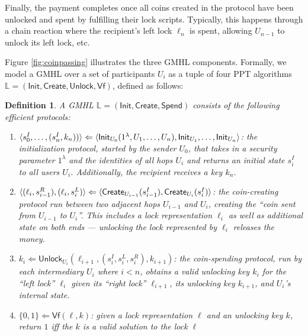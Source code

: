 \documentclass[USenglish,oneside,twocolumn]{article}
\newtheorem{definition}{Definition}[section]
\begin{document}
Finally, the payment completes once all coins created in the protocol have been unlocked and spent by fulfilling their lock scripts. Typically, this happens through a chain reaction where the recipient's left lock $\ell_n$ is spent, allowing $U_{n-1}$ to unlock its left lock, etc.

Figure \ref{fig:coinpassing} illustrates the three GMHL components.  Formally, we model a GMHL over a set of participants $U_i$ as a tuple of four PPT algorithms $\mathbb{L}=(\mathsf{Init}, \mathsf{Create}, \mathsf{Unlock}, \mathsf{Vf})$, defined as follows:


\begin{definition}
    A GMHL $\mathbb{L}=(\mathsf{Init}, \mathsf{Create}, \mathsf{Spend})$ consists of the following efficient protocols:
    \begin{enumerate}
        \item $\langle s_0^I,\dots,(s_n^I, k_n)) \rangle \Leftarrow\\ \langle \mathsf{Init}_{U_0}(1^\lambda, U_1,\dots,U_n), \mathsf{Init}_{U_1}, \dots, \mathsf{Init}_{U_n} \rangle$: the initialization protocol, started by the sender $U_0$, that takes in a security parameter $1^\lambda$ and the identities of all hops $U_i$ and returns an initial state $s_i^I$ to all users $U_i$. Additionally, the recipient receives a key $k_n$.
        \item $\langle (\ell_i, s_{i-1}^R), (\ell_i, s^L_{i}) \rangle \Leftarrow \\
                  \langle \mathsf{Create}_{U_{i-1}}(s_{i-1}^I), \mathsf{Create}_{U_{i}}(s_{i}^I) \rangle$: the coin-creating protocol run between two adjacent hops $U_{i-1}$ and $U_{i}$, creating the ``coin sent from $U_{i-1}$ to $U_{i}$''. This includes a lock representation $\ell_i$ as well as additional state on both ends --- unlocking the lock represented by $\ell_i$ releases the money.
        \item $k_i \Leftarrow \mathsf{Unlock}_{U_i}(\ell_{i+1}, (s^I_i, s^L_i, s^R_i), k_{i+1})$: the coin-spending protocol, run by each intermediary $U_i$ where $i<n$, obtains a valid unlocking key $k_i$ for the ``left lock'' $\ell_i$ given its ``right lock'' $\ell_{i+1}$, its unlocking key $k_{i+1}$, and $U_i$'s internal state.
        \item $\{ 0,1 \} \Leftarrow \mathsf{Vf}(\ell, k)$: given a lock representation $\ell$ and an unlocking key $k$, return $1$ iff the $k$ is a valid solution to the lock $\ell$
    \end{enumerate}
\end{definition}
\end{document}
